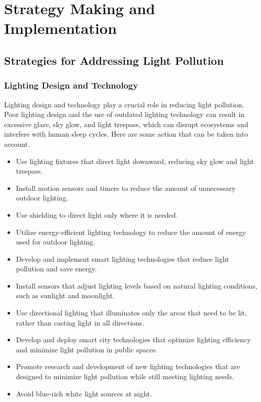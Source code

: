 \MinParskip{}

\section{Strategy Making and Implementation}

\subsection{Strategies for Addressing Light Pollution}

\subsubsection{Lighting Design and Technology}

Lighting design and technology play a crucial role in reducing light pollution. Poor lighting design and the use of outdated lighting technology can result in excessive glare, sky glow, and light trespass, which can disrupt ecosystems and interfere with human sleep cycles. Here are some action that can be taken into account.

\begin{itemize}
    \item Use lighting fixtures that direct light downward, reducing sky glow and light trespass.
    
    \item Install motion sensors and timers to reduce the amount of unnecessary outdoor lighting.
    
    \item Use shielding to direct light only where it is needed.
    
    \item Utilize energy-efficient lighting technology to reduce the amount of energy used for outdoor lighting.

    \item Develop and implement smart lighting technologies that reduce light pollution and save energy.
    
    \item Install sensors that adjust lighting levels based on natural lighting conditions, such as sunlight and moonlight.
    
    \item Use directional lighting that illuminates only the areas that need to be lit, rather than casting light in all directions.
    
    \item Develop and deploy smart city technologies that optimize lighting efficiency and minimize light pollution in public spaces.
    
    \item Promote research and development of new lighting technologies that are designed to minimize light pollution while still meeting lighting needs.

    \item Avoid blue-rich white light sources at night. 

\end{itemize}

